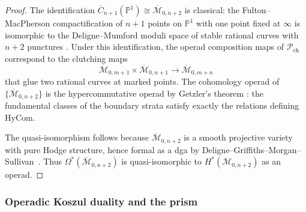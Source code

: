 \begin{proof}
The identification
$\overline{C}_{n+1}(\mathbb{P}^1) \cong \overline{\mathcal{M}}_{0,n+2}$
is classical: the Fulton--MacPherson compactification of $n+1$ points on
$\mathbb{P}^1$ with one point fixed at $\infty$ is isomorphic to the
Deligne--Mumford moduli space of stable rational curves with $n+2$
punctures \cite{Knudsen83}. Under this identification, the operad composition
maps of $\mathcal{P}_{\mathrm{ch}}$ correspond to the clutching maps
\[
\overline{\mathcal{M}}_{0,m+1} \times
\overline{\mathcal{M}}_{0,n+1} \to
\overline{\mathcal{M}}_{0,m+n}
\]
that glue two rational curves at marked points. The cohomology operad
of $\{\overline{\mathcal{M}}_{0,n+2}\}$ is the hypercommutative operad
by Getzler's theorem \cite[Theorem~1.5]{Get95}: the fundamental classes
of the boundary strata satisfy exactly the relations defining
$\mathrm{HyCom}$.

The quasi-isomorphism follows because
$\overline{\mathcal{M}}_{0,n+2}$ is a smooth projective variety
with pure Hodge structure, hence formal as a dga by
Deligne--Griffiths--Morgan--Sullivan~\cite{DGMS75}. Thus
$\Omega^*(\overline{\mathcal{M}}_{0,n+2})$ is quasi-isomorphic
to $H^*(\overline{\mathcal{M}}_{0,n+2})$ as an operad.
\end{proof}

\subsubsection{Operadic Koszul duality and the prism}

